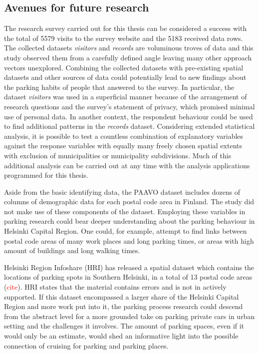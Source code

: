 \newpage
\subsection{Avenues for future research}
\justify

The research survey carried out for this thesis can be considered a success with the total of 5579 visits to the survey website and the 5183 received data rows. The collected datasets \textit{visitors} and \textit{records} are voluminous troves of data and this study observed them from a carefully defined angle leaving many other approach vectors unexplored. Combining the collected datasets with pre-existing spatial datasets and other sources of data could potentially lead to new findings about the parking habits of people that answered to the survey. In particular, the dataset \textit{visitors} was used in a superficial manner because of the arrangement of research questions and the survey's statement of privacy, which promised minimal use of personal data. In another context, the respondent behaviour could be used to find additional patterns in the \textit{records} dataset. Considering extended statistical analysis, it is possible to test a countless combination of explanatory variables against the response variables with equally many freely chosen spatial extents with exclusion of municipalities or municipality subdivisions. Much of this additional analysis can be carried out at any time with the analysis applications programmed for this thesis.

Aside from the basic identifying data, the PAAVO dataset includes dozens of columns of demographic data for each postal code area in Finland. The study did not make use of these components of the dataset. Employing these variables in parking research could bear deeper understanding about the parking behaviour in Helsinki Capital Region. One could, for example, attempt to find links between postal code areas of many work places and long parking times, or areas with high amount of buildings and long walking times.

Helsinki Region Infoshare (HRI) has released a spatial dataset which contains the locations of parking spots in Southern Helsinki, in a total of 13 postal code areas (\textcolor{red}{cite}). HRI states that the material contains errors and is not in actively supported. If this dataset encompassed a larger share of the Helsinki Capital Region and more work put into it, the parking process research could descend from the abstract level for a more grounded take on parking private cars in urban setting and the challenges it involves. The amount of parking spaces, even if it would only be an estimate, would shed an informative light into the possible connection of cruising for parking and parking places.

